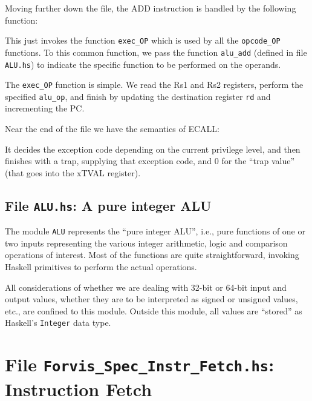 \documentclass[11pt]{article}
\begin{document}
Moving further down the file, the ADD instruction is handled by the
following function:



This just invokes the function \verb|exec_OP| which is used by all the
\verb|opcode_OP| functions.  To this common function, we pass the
function \verb|alu_add| (defined in file \verb|ALU.hs|) to indicate
the specific function to be performed on the operands.

The \verb|exec_OP| function is simple.  We read the Rs1 and Rs2
registers, perform the specified \verb|alu_op|, and finish by updating
the destination register \verb|rd| and incrementing the PC.



Near the end of the file we have the semantics of ECALL:



It decides the exception code depending on the current privilege
level, and then finishes with a trap, supplying that exception code,
and 0 for the ``trap value'' (that goes into the xTVAL register).


\subsection{File {\tt ALU.hs}: A pure integer ALU}

The module \verb|ALU| represents the ``pure integer ALU'', i.e., pure
functions of one or two inputs representing the various integer
arithmetic, logic and comparison operations of interest.  Most of the
functions are quite straightforward, invoking Haskell primitives to
perform the actual operations.

All considerations of whether we are dealing with 32-bit or 64-bit
input and output values, whether they are to be interpreted as signed
or unsigned values, etc., are confined to this module.  Outside this
module, all values are ``stored'' as Haskell's \verb|Integer| data
type.


\section{File {\tt Forvis\_Spec\_Instr\_Fetch.hs}: Instruction Fetch}
\end{document}
